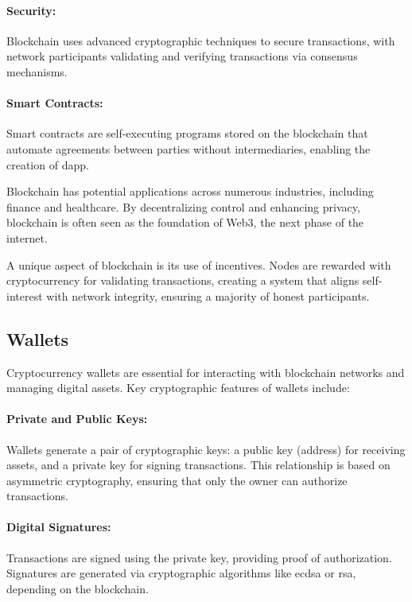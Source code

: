 \paragraph{Security:}
Blockchain uses advanced cryptographic techniques to secure transactions, with
network participants validating and verifying transactions via consensus
mechanisms.

\paragraph{Smart Contracts:}
Smart contracts are self-executing programs stored on the blockchain that
automate agreements between parties without intermediaries, enabling the
creation of \gls{dapp}.

Blockchain has potential applications across numerous industries, including
finance and healthcare. By decentralizing control and enhancing privacy,
blockchain is often seen as the foundation of Web3, the next phase of the
internet.

A unique aspect of blockchain is its use of incentives. Nodes are rewarded with
cryptocurrency for validating transactions, creating a system that aligns
self-interest with network integrity, ensuring a majority of honest
participants.

\subsection{Wallets}\label{subsec:wallets}

Cryptocurrency wallets are essential for interacting with blockchain networks
and managing digital assets. Key cryptographic features of wallets include:

\paragraph{Private and Public Keys:}
Wallets generate a pair of cryptographic keys: a public key (address) for
receiving assets, and a private key for signing transactions. This relationship
is based on asymmetric cryptography, ensuring that only the owner can authorize
transactions.

\paragraph{Digital Signatures:}
Transactions are signed using the private key, providing proof of
authorization. Signatures are generated via cryptographic algorithms like
\gls{ecdsa} or \gls{rsa}, depending on the blockchain.

